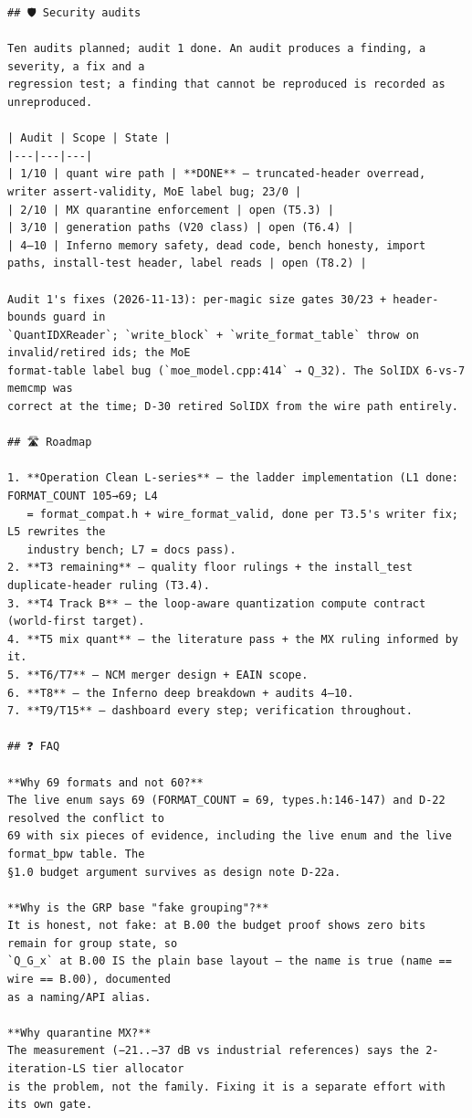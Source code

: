 \begin{Verbatim}[breaklines,breakanywhere,fontsize=\footnotesize]
## 🛡️ Security audits

Ten audits planned; audit 1 done. An audit produces a finding, a severity, a fix and a
regression test; a finding that cannot be reproduced is recorded as unreproduced.

| Audit | Scope | State |
|---|---|---|
| 1/10 | quant wire path | **DONE** — truncated-header overread, writer assert-validity, MoE label bug; 23/0 |
| 2/10 | MX quarantine enforcement | open (T5.3) |
| 3/10 | generation paths (V20 class) | open (T6.4) |
| 4–10 | Inferno memory safety, dead code, bench honesty, import paths, install-test header, label reads | open (T8.2) |

Audit 1's fixes (2026-11-13): per-magic size gates 30/23 + header-bounds guard in
`QuantIDXReader`; `write_block` + `write_format_table` throw on invalid/retired ids; the MoE
format-table label bug (`moe_model.cpp:414` → Q_32). The SolIDX 6-vs-7 memcmp was
correct at the time; D-30 retired SolIDX from the wire path entirely.

## 🛣️ Roadmap

1. **Operation Clean L-series** — the ladder implementation (L1 done: FORMAT_COUNT 105→69; L4
   = format_compat.h + wire_format_valid, done per T3.5's writer fix; L5 rewrites the
   industry bench; L7 = docs pass).
2. **T3 remaining** — quality floor rulings + the install_test duplicate-header ruling (T3.4).
3. **T4 Track B** — the loop-aware quantization compute contract (world-first target).
4. **T5 mix quant** — the literature pass + the MX ruling informed by it.
5. **T6/T7** — NCM merger design + EAIN scope.
6. **T8** — the Inferno deep breakdown + audits 4–10.
7. **T9/T15** — dashboard every step; verification throughout.

## ❓ FAQ

**Why 69 formats and not 60?**
The live enum says 69 (FORMAT_COUNT = 69, types.h:146-147) and D-22 resolved the conflict to
69 with six pieces of evidence, including the live enum and the live format_bpw table. The
§1.0 budget argument survives as design note D-22a.

**Why is the GRP base "fake grouping"?**
It is honest, not fake: at B.00 the budget proof shows zero bits remain for group state, so
`Q_G_x` at B.00 IS the plain base layout — the name is true (name == wire == B.00), documented
as a naming/API alias.

**Why quarantine MX?**
The measurement (−21..−37 dB vs industrial references) says the 2-iteration-LS tier allocator
is the problem, not the family. Fixing it is a separate effort with its own gate.


\end{Verbatim}
